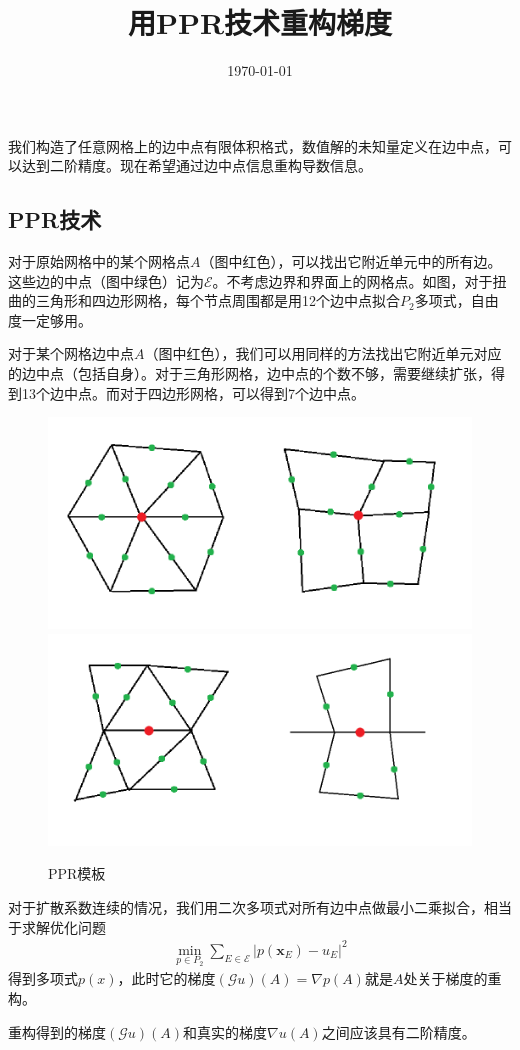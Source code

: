 \documentclass[12pt,a4paper]{article}
\title{用PPR技术重构梯度}
\date{\today}
\theoremstyle{plain}
\begin{document}
\maketitle

我们构造了任意网格上的边中点有限体积格式，数值解的未知量定义在边中点，可以达到二阶精度。现在希望通过边中点信息重构导数信息。

\subsection*{PPR技术}

对于原始网格中的某个网格点$A$（图中红色），可以找出它附近单元中的所有边。这些边的中点（图中绿色）记为$\mathcal{E}$。不考虑边界和界面上的网格点。如图，对于扭曲的三角形和四边形网格，每个节点周围都是用12个边中点拟合$P_2$多项式，自由度一定够用。

对于某个网格边中点$A$（图中红色），我们可以用同样的方法找出它附近单元对应的边中点（包括自身）。对于三角形网格，边中点的个数不够，需要继续扩张，得到13个边中点。而对于四边形网格，可以得到7个边中点。

\begin{figure}[H]
\centering
\includegraphics[width=0.49\linewidth]{stencil1}
\includegraphics[width=0.49\linewidth]{stencil2}
\caption{PPR模板}
\end{figure}

对于扩散系数连续的情况，我们用二次多项式对所有边中点做最小二乘拟合，相当于求解优化问题
\begin{align*}
\min_{p \in P_2} \sum_{E \in \mathcal{E}} |p(\bm{x}_E) - u_E|^2
\end{align*}
得到多项式$p(x)$，此时它的梯度$(\mathcal{G} u) (A) = \nabla p(A)$就是$A$处关于梯度的重构。

重构得到的梯度$(\mathcal{G} u) (A)$和真实的梯度$\nabla u(A)$之间应该具有二阶精度。
\end{document}
